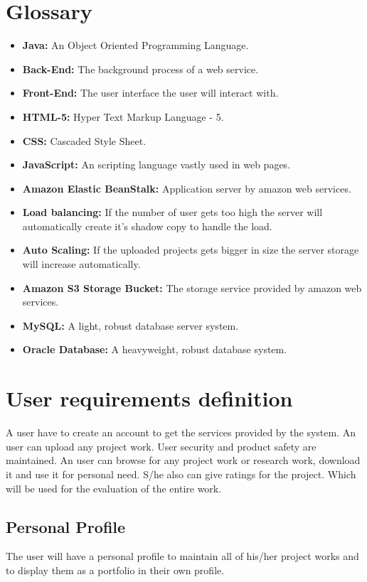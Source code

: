 \documentclass{scrreprt}
\begin{document}
\chapter{Glossary}
\begin{itemize}
\item \textbf{Java:} An Object Oriented Programming Language.
\item \textbf{Back-End:} The background process of a web service.
\item \textbf{Front-End:} The user interface the user will interact with.
\item \textbf{HTML-5:} Hyper Text Markup Language - 5.
\item \textbf{CSS:} Cascaded Style Sheet.
\item \textbf{JavaScript:} An scripting language vastly used in web pages.
\item \textbf{Amazon Elastic BeanStalk:} Application server by amazon web services.
\item \textbf{Load balancing:} If the number of user gets too high the server will automatically create it's shadow copy to handle the load.
\item \textbf{Auto Scaling:} If the uploaded projects gets bigger in size the server storage will increase automatically.
\item \textbf{Amazon S3 Storage Bucket:} The storage service provided by amazon web services.
\item \textbf{MySQL:} A light, robust database server system.
\item \textbf{Oracle Database:} A heavyweight, robust database system.
\end{itemize}
\chapter{User requirements definition}
A user have to create an account to get the services provided by the system. An user can upload any project work. User security and product safety are maintained. An user can browse for any project work or research work, download it and use it for personal need. S/he also can give ratings for the project. Which will be used for the evaluation of the entire work.

\section{Personal Profile}
The user will have a personal profile to maintain all of his/her project works and to display them as a portfolio in their own profile.
\end{document}
